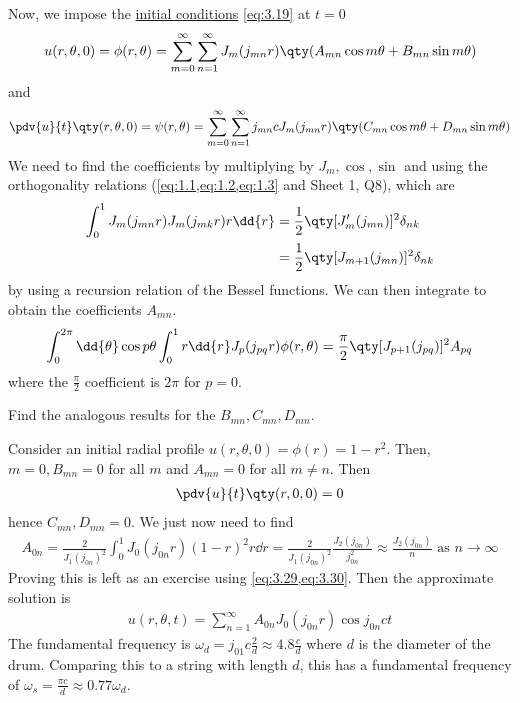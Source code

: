 Now, we impose the \underline{initial conditions} \cref{eq:3.19} at $t = 0$
\begin{align} \label{eq:3.37}
	u(r,\theta,0) = \phi(r,\theta) = \sum_{m=0}^\infty \sum_{n=1}^\infty J_m (j_{mn}r) \qty( A_{mn} \cos m \theta + B_{mn} \sin m\theta )
\end{align}
and
\begin{align*}
	\pdv{u}{t}\qty(r,\theta,0) = \psi(r,\theta) = \sum_{m=0}^\infty \sum_{n=1}^\infty j_{mn} c J_m (j_{mn}r) \qty( C_{mn} \cos m \theta + D_{mn} \sin m\theta )
\end{align*}
We need to find the coefficients by multiplying by $J_m, \cos, \sin$ and using the orthogonality relations (\cref{eq:1.1,eq:1.2,eq:1.3} and Sheet 1, Q8), which are
\begin{align}
	\int_0^1 J_m(j_{mn} r) J_m(j_{mk} r) r \dd{r} &= \frac{1}{2}\qty[J_m'(j_{mn})]^2 \delta_{nk} \label{eq:3.38} \\
	&= \frac{1}{2}\qty[J_{m+1}(j_{mn})]^2 \delta_{nk} \label{eq:3.39}
\end{align}
by using a recursion relation of the Bessel functions.
We can then integrate to obtain the coefficients $A_{mn}$.
\begin{align*}
	\int_0^{2\pi} \dd{\theta} \cos p\theta \int_0^1 r \dd{r} J_p(j_{pq} r) \phi(r,\theta) = \frac{\pi}{2}\qty[J_{p+1}(j_{pq})]^2 A_{pq}
\end{align*}
where the $\frac{\pi}{2}$ coefficient is $2\pi$ for $p = 0$.
\begin{exercise}
	Find the analogous results for the $B_{mn}, C_{mn}, D_{mn}$.
\end{exercise} 
 
\begin{example}
	Consider an initial radial profile $u(r,\theta,0) = \phi(r) = 1 - r^2$.
	Then, $m = 0, B_{mn} = 0$ for all $m$ and $A_{mn} = 0$ for all $m \neq n$.
	Then
	\begin{align*}
		\pdv{u}{t}\qty(r,0,0) = 0
	\end{align*}
	hence $C_{mn}, D_{mn} = 0$.
	We just now need to find
	\begin{align*}
		A_{0n} = \frac{2}{J_1(j_{0n})^2} \int_0^1 J_0(j_{0n}r)(1-r)^2 r\dd{r} = \frac{2}{J_1(j_{0n})^2} \frac{J_2(j_{0n})}{j_{0n}^2} \approx \frac{J_2(j_{0n})}{n} \text{ as } n \to \infty
	\end{align*}
	Proving this is left as an exercise using \cref{eq:3.29,eq:3.30}.
	Then the approximate solution is
	\begin{align*}
		u(r,\theta,t) = \sum_{n=1}^\infty A_{0n} J_0(j_{0n}r)\cos j_{0n} ct
	\end{align*}
	The fundamental frequency is $\omega_d = j_{01} c \frac{2}{d} \approx 4.8\frac{c}{d}$ where $d$ is the diameter of the drum.
	Comparing this to a string with length $d$, this has a fundamental frequency of $\omega_s = \frac{\pi c}{d} \approx 0.77 \omega_d$.
\end{example}

